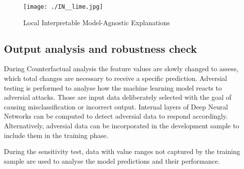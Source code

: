 \begin{figure}[H]
	\centering
	\texttt{[image: ./IN\_\_lime.jpg]}
    \caption{Local Interpretable Model-Agnostic Explanations}
    \label{fig:in_lime}
\end{figure}

\subsection{Output analysis and robustness check}
During Counterfactual analysis the feature values are slowly changed to assess, which total changes are necessary to receive a specific prediction. Adversial testing is performed to analyse how the machine learning model reacts to adversial attacks. Those are input data deliberately selected with the goal of causing misclassification or incorrect output. Internal layers of Deep Neural Networks can be computed to detect adversial data to respond accordingly. Alternatively, adversial data can be incorporated in the development sample to include them in the training phase. 

During the sensitivity test, data with value ranges not captured by the training sample are used to analyse the model predictions and their performance. 